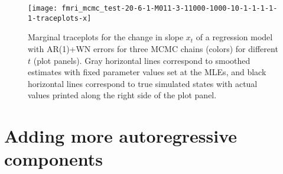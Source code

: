 \documentclass{article}
\begin{document}
\begin{figure}[ht]
\texttt{[image: fmri\_mcmc\_test-20-6-1-M011-3-11000-1000-10-1-1-1-1-1-traceplots-x]}
\caption{Marginal traceplots for the change in slope $x_t$ of a regression model with AR(1)+WN errors for three MCMC chains (colors) for different $t$ (plot panels). Gray horizontal lines correspond to smoothed estimates with fixed parameter values set at the MLEs, and black horizontal lines correspond to true simulated states with actual values printed along the right side of the plot panel.} \label{fig:tracex-arwn}
\end{figure}

%

\clearpage

\section{Adding more autoregressive components} \label{sec:add}
\end{document}
